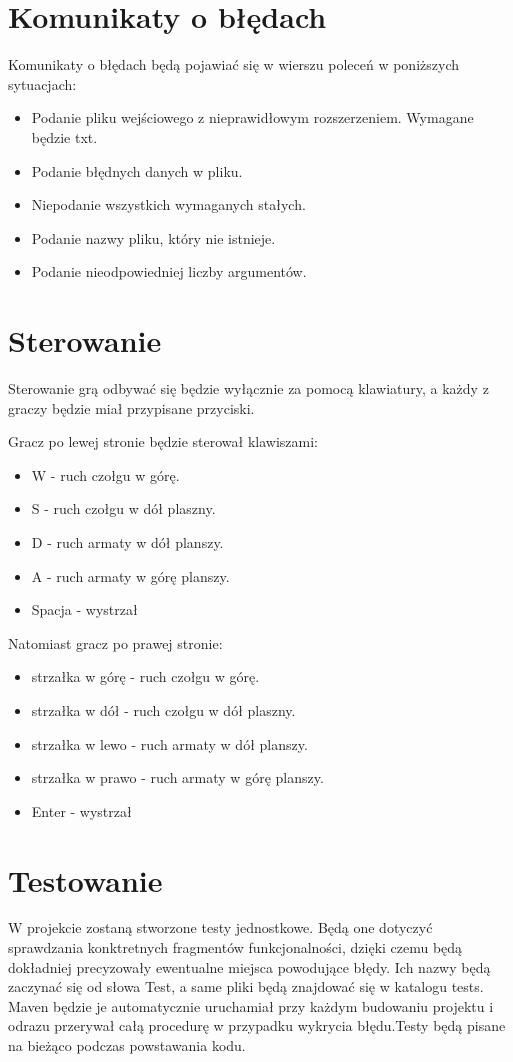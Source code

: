 \documentclass{article}
\begin{document}
\section{Komunikaty o błędach}
{\fontsize{14}{14}\selectfont 
Komunikaty o błędach będą pojawiać się w wierszu poleceń w poniższych sytuacjach:
\begin{itemize}
\item Podanie pliku wejściowego z nieprawidłowym rozszerzeniem. Wymagane będzie txt.
\item Podanie błędnych danych w pliku.
\item Niepodanie wszystkich wymaganych stałych.
\item Podanie nazwy pliku, który nie istnieje.
\item Podanie nieodpowiedniej liczby argumentów.

\end{itemize}
}



\section{Sterowanie}
{\fontsize{14}{14}\selectfont 
Sterowanie grą odbywać się będzie wyłącznie za pomocą klawiatury, a każdy z graczy będzie miał przypisane przyciski.


Gracz po lewej stronie będzie sterował klawiszami:
\begin{itemize}
    \item W - ruch czołgu w górę.
    \item S - ruch czołgu w dół plaszny.
    \item D - ruch armaty w dół planszy.
    \item A - ruch armaty w górę planszy.
    \item Spacja - wystrzał
\end{itemize}


Natomiast gracz po prawej stronie:
\begin{itemize}
    \item strzałka w górę - ruch czołgu w górę.
    \item strzałka w dół - ruch czołgu w dół plaszny.
    \item strzałka w lewo - ruch armaty w dół planszy.
    \item strzałka w prawo - ruch armaty w górę planszy.
    \item Enter - wystrzał
\end{itemize}

}


\section{Testowanie}
{\fontsize{14}{14}\selectfont 
W projekcie zostaną stworzone testy jednostkowe. Będą one dotyczyć sprawdzania konktretnych fragmentów funkcjonalności, 
dzięki czemu będą dokładniej precyzowały ewentualne miejsca powodujące błędy. 
Ich nazwy będą zaczynać się od słowa Test, a same pliki będą znajdować się w katalogu tests.
Maven będzie je automatycznie uruchamiał przy każdym budowaniu projektu i odrazu przerywał całą procedurę w przypadku wykrycia błędu.Testy będą pisane na bieżąco podczas powstawania kodu.
}
\end{document}
